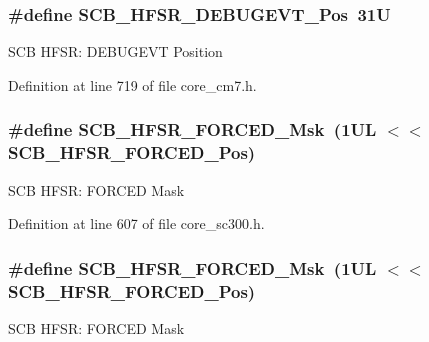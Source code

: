 \subsubsection[{\texorpdfstring{S\+C\+B\+\_\+\+H\+F\+S\+R\+\_\+\+D\+E\+B\+U\+G\+E\+V\+T\+\_\+\+Pos}{SCB_HFSR_DEBUGEVT_Pos}}]{\setlength{\rightskip}{0pt plus 5cm}\#define S\+C\+B\+\_\+\+H\+F\+S\+R\+\_\+\+D\+E\+B\+U\+G\+E\+V\+T\+\_\+\+Pos~31U}\hypertarget{group___c_m_s_i_s___s_c_b_ga300c90cfb7b35c82b4d44ad16c757ffb}{}\label{group___c_m_s_i_s___s_c_b_ga300c90cfb7b35c82b4d44ad16c757ffb}
S\+CB H\+F\+SR\+: D\+E\+B\+U\+G\+E\+VT Position 

Definition at line 719 of file core\+\_\+cm7.\+h.

\subsubsection[{\texorpdfstring{S\+C\+B\+\_\+\+H\+F\+S\+R\+\_\+\+F\+O\+R\+C\+E\+D\+\_\+\+Msk}{SCB_HFSR_FORCED_Msk}}]{\setlength{\rightskip}{0pt plus 5cm}\#define S\+C\+B\+\_\+\+H\+F\+S\+R\+\_\+\+F\+O\+R\+C\+E\+D\+\_\+\+Msk~(1\+U\+L $<$$<$ S\+C\+B\+\_\+\+H\+F\+S\+R\+\_\+\+F\+O\+R\+C\+E\+D\+\_\+\+Pos)}\hypertarget{group___c_m_s_i_s___s_c_b_ga6560d97ed043bc01152a7247bafa3157}{}\label{group___c_m_s_i_s___s_c_b_ga6560d97ed043bc01152a7247bafa3157}
S\+CB H\+F\+SR\+: F\+O\+R\+C\+ED Mask 

Definition at line 607 of file core\+\_\+sc300.\+h.

\subsubsection[{\texorpdfstring{S\+C\+B\+\_\+\+H\+F\+S\+R\+\_\+\+F\+O\+R\+C\+E\+D\+\_\+\+Msk}{SCB_HFSR_FORCED_Msk}}]{\setlength{\rightskip}{0pt plus 5cm}\#define S\+C\+B\+\_\+\+H\+F\+S\+R\+\_\+\+F\+O\+R\+C\+E\+D\+\_\+\+Msk~(1\+U\+L $<$$<$ S\+C\+B\+\_\+\+H\+F\+S\+R\+\_\+\+F\+O\+R\+C\+E\+D\+\_\+\+Pos)}\hypertarget{group___c_m_s_i_s___s_c_b_ga6560d97ed043bc01152a7247bafa3157}{}\label{group___c_m_s_i_s___s_c_b_ga6560d97ed043bc01152a7247bafa3157}
S\+CB H\+F\+SR\+: F\+O\+R\+C\+ED Mask 

